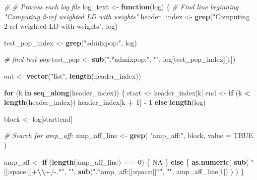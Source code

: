 \documentclass[
]{article}
\newenvironment{Shaded}{\begin{snugshade}}{\end{snugshade}}
\newcommand{\AttributeTok}[1]{\textcolor[rgb]{0.13,0.29,0.53}{#1}}
\newcommand{\CommentTok}[1]{\textcolor[rgb]{0.56,0.35,0.01}{\textit{#1}}}
\newcommand{\ConstantTok}[1]{\textcolor[rgb]{0.56,0.35,0.01}{#1}}
\newcommand{\ControlFlowTok}[1]{\textcolor[rgb]{0.13,0.29,0.53}{\textbf{#1}}}
\newcommand{\DecValTok}[1]{\textcolor[rgb]{0.00,0.00,0.81}{#1}}
\newcommand{\FunctionTok}[1]{\textcolor[rgb]{0.13,0.29,0.53}{\textbf{#1}}}
\newcommand{\NormalTok}[1]{#1}
\newcommand{\OtherTok}[1]{\textcolor[rgb]{0.56,0.35,0.01}{#1}}
\newcommand{\SpecialCharTok}[1]{\textcolor[rgb]{0.81,0.36,0.00}{\textbf{#1}}}
\newcommand{\StringTok}[1]{\textcolor[rgb]{0.31,0.60,0.02}{#1}}
\begin{document}
\begin{Shaded}
\begin{Highlighting}[]
\CommentTok{\# \# Process each log file}
\NormalTok{log\_text }\OtherTok{\textless{}{-}} \ControlFlowTok{function}\NormalTok{(log) \{}
  \CommentTok{\# Find line beginning "Computing 2{-}ref weighted LD with weights"}
\NormalTok{  header\_index }\OtherTok{\textless{}{-}} \FunctionTok{grep}\NormalTok{(}\StringTok{"Computing 2{-}ref weighted LD with weights"}\NormalTok{, log)}

\NormalTok{  test\_pop\_index }\OtherTok{\textless{}{-}} \FunctionTok{grep}\NormalTok{(}\StringTok{"admixpop:"}\NormalTok{, log)}

  \CommentTok{\# find test pop}
\NormalTok{  test\_pop }\OtherTok{\textless{}{-}} \FunctionTok{sub}\NormalTok{(}\StringTok{".*admixpop:"}\NormalTok{, }\StringTok{""}\NormalTok{, log[test\_pop\_index][}\DecValTok{1}\NormalTok{])}

\NormalTok{  out }\OtherTok{\textless{}{-}} \FunctionTok{vector}\NormalTok{(}\StringTok{"list"}\NormalTok{, }\FunctionTok{length}\NormalTok{(header\_index))}


  \ControlFlowTok{for}\NormalTok{ (k }\ControlFlowTok{in} \FunctionTok{seq\_along}\NormalTok{(header\_index)) \{}
\NormalTok{    start }\OtherTok{\textless{}{-}}\NormalTok{ header\_index[k]}
\NormalTok{    end }\OtherTok{\textless{}{-}}
      \ControlFlowTok{if}\NormalTok{ (k }\SpecialCharTok{\textless{}} \FunctionTok{length}\NormalTok{(header\_index)) header\_index[k }\SpecialCharTok{+} \DecValTok{1}\NormalTok{] }\SpecialCharTok{{-}} \DecValTok{1} \ControlFlowTok{else} \FunctionTok{length}\NormalTok{(log)}

\NormalTok{    block }\OtherTok{\textless{}{-}}\NormalTok{ log[start}\SpecialCharTok{:}\NormalTok{end]}

    \CommentTok{\# Search for \textquotesingle{}amp\_aff:\textquotesingle{}}
\NormalTok{    amp\_aff\_line }\OtherTok{\textless{}{-}} \FunctionTok{grep}\NormalTok{(}
      \StringTok{"amp\_aff:"}\NormalTok{,}
\NormalTok{      block,}
      \AttributeTok{value =} \ConstantTok{TRUE}
\NormalTok{    )}

\NormalTok{    amp\_aff }\OtherTok{\textless{}{-}} \ControlFlowTok{if}\NormalTok{ (}\FunctionTok{length}\NormalTok{(amp\_aff\_line) }\SpecialCharTok{==} \DecValTok{0}\NormalTok{) \{}
      \ConstantTok{NA}
\NormalTok{    \} }\ControlFlowTok{else}\NormalTok{ \{}
      \FunctionTok{as.numeric}\NormalTok{(}
        \FunctionTok{sub}\NormalTok{(}
          \StringTok{"[[:space:]]+}\SpecialCharTok{\textbackslash{}\textbackslash{}}\StringTok{+/{-}.*"}\NormalTok{, }\StringTok{""}\NormalTok{,}
          \FunctionTok{sub}\NormalTok{(}\StringTok{".*amp\_aff:[[:space:]]*"}\NormalTok{, }\StringTok{""}\NormalTok{, amp\_aff\_line[}\DecValTok{1}\NormalTok{])}
\NormalTok{        )}
\NormalTok{      )}
\NormalTok{    \}}


\end{Highlighting}
\end{Shaded}
\end{document}
